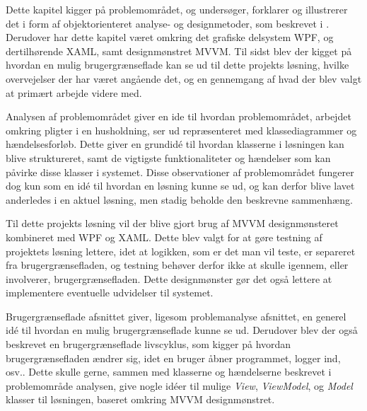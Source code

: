 Dette kapitel kigger på problemområdet, og undersøger, forklarer og illustrerer det i form af objektorienteret analyse- og designmetoder, som beskrevet i \cite{ObjektAnalyseDesign}. Derudover har dette kapitel været omkring det grafiske delsystem WPF, og dertilhørende XAML, samt designmønstret MVVM. Til sidst blev der kigget på hvordan en mulig brugergrænseflade kan se ud til dette projekts løsning, hvilke overvejelser der har været angående det, og en gennemgang af hvad der blev valgt at primært arbejde videre med.

Analysen af problemområdet giver en ide til hvordan problemområdet, arbejdet omkring pligter i en husholdning, ser ud repræsenteret med klassediagrammer og hændelsesforløb. Dette giver en grundidé til hvordan klasserne i løsningen kan blive struktureret, samt de vigtigste funktionaliteter og hændelser som kan påvirke disse klasser i systemet. Disse observationer af problemområdet fungerer dog kun som en idé til hvordan en løsning kunne se ud, og kan derfor blive lavet anderledes i en aktuel løsning, men stadig beholde den beskrevne sammenhæng.

Til dette projekts løsning vil der blive gjort brug af MVVM designmønsteret kombineret med WPF og XAML. Dette blev valgt for at gøre testning af projektets løsning lettere, idet at logikken, som er det man vil teste, er separeret fra brugergrænsefladen, og testning behøver derfor ikke at skulle igennem, eller involverer, brugergrænsefladen. Dette designmønster gør det også lettere at implementere eventuelle udvidelser til systemet.

Brugergrænseflade afsnittet giver, ligesom problemanalyse afsnittet, en generel idé til hvordan en mulig brugergrænseflade kunne se ud. Derudover blev der også beskrevet en brugergrænseflade livscyklus, som kigger på hvordan brugergrænsefladen ændrer sig, idet en bruger åbner programmet, logger ind, osv.. Dette skulle gerne, sammen med klasserne og hændelserne beskrevet i problemområde analysen, give nogle idéer til mulige \textit{View}, \textit{ViewModel}, og \textit{Model} klasser til løsningen, baseret omkring MVVM designmønstret.